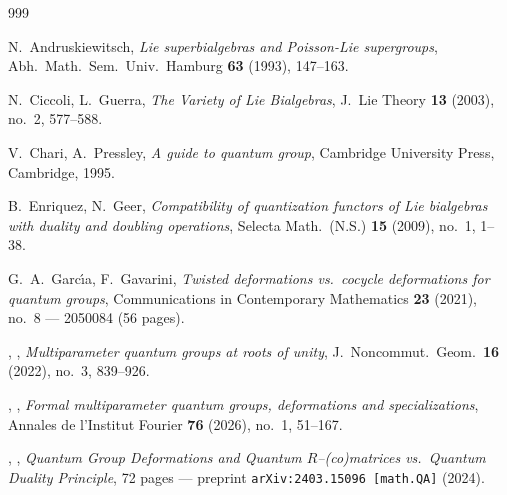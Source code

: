 \documentclass[12pt,reqno,twoside,a4paper]{amsart}
\numberwithin{equation}{section}
\theoremstyle{definition}
\newtheorem{free text}[lema]{}
\theoremstyle{remark}
\theoremstyle{plain}
\begin{document}
\begin{thebibliography}{999}

\vskip11pt

  {\sc N.\ Andruskiewitsch},
  \textit{Lie superbialgebras and Poisson-Lie supergroups},
Abh.\ Math.\ Sem.\ Univ.\ Hamburg  \textbf{63}  (1993), 147--163.

\vskip7pt

  {\sc N.\ Ciccoli},  {\sc L.\ Guerra},
  {\it The Variety of Lie Bialgebras},
  J.\ Lie Theory  {\bf 13}  (2003), no.\ 2, 577--588.

\vskip7pt

  {\sc V.\ Chari},  {\sc A.\ Pressley},
  {\it A guide to quantum group},
  Cambridge University Press, Cambridge, 1995.

%
%
%

\vskip7pt

  {\sc B.\ Enriquez},  {\sc N.\ Geer},
  \textit{Compatibility of quantization functors of Lie bialgebras with duality and doubling operations},
  Selecta Math.\ (N.S.)  \textbf{15}  (2009), no.\ 1, 1--38.

\vskip7pt

  {\sc G.\ A.\ Garc{\'\i}a},  {\sc F.\ Gavarini},
  \textit{Twisted deformations vs.\ cocycle deformations for quantum groups},  Communications in Contemporary Mathematics  \textbf{23}  (2021), no.\ 8  ---  2050084 (56 pages).

\vskip7pt

  \bysame , \bysame ,
  \textit{Multiparameter quantum groups at roots of unity},
  J.\ Noncommut.\ Geom.\  \textbf{16}  (2022), no.\ 3, 839--926.

\vskip7pt

  \bysame , \bysame ,
  \textit{Formal multiparameter quantum groups,  deformations and specializations},  Annales de l'Institut Fourier  \textbf{76}  (2026), no.\ 1, 51--167.

\vskip7pt

  \bysame , \bysame ,
  \textit{Quantum Group Deformations and Quantum  $ R $--(co)matrices vs.\ Quantum Duality Principle},  72 pages   ---   preprint  \texttt{arXiv:2403.15096 [math.QA]}  (2024).

\vskip7pt


\end{thebibliography}
\end{document}
